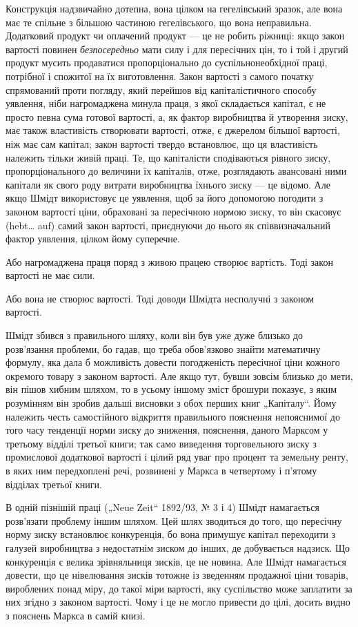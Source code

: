 Конструкція надзвичайно дотепна, вона цілком на гегелівський
зразок, але вона має те спільне з більшою частиною гегелівського,
що вона неправильна. Додатковий продукт чи оплачений
продукт — це не робить ріжниці: якщо закон вартості повинен
\emph{безпосередньо} мати силу і для пересічних цін, то і той і другий
продукт мусить продаватися пропорціонально до суспільнонеобхідної
праці, потрібної і спожитої на їх виготовлення. Закон
вартості з самого початку спрямований проти погляду, який перейшов
від капіталістичного способу уявлення, ніби нагромаджена
минула праця, з якої складається капітал, є не просто певна сума
готової вартості, а, як фактор виробництва й утворення зиску, має
також властивість створювати вартості, отже, є джерелом більшої
вартості, ніж має сам капітал; закон вартості твердо встановлює,
що ця властивість належить тільки живій праці. Те, що капіталісти
сподіваються рівного зиску, пропорціонального до величини
їх капіталів, отже, розглядають авансовані ними капітали як свого
роду витрати виробництва їхнього зиску — це відомо. Але якщо
Шмідт використовує це уявлення, щоб за його допомогою погодити
з законом вартості ціни, обраховані за пересічною нормою
зиску, то він скасовує (hebt\dots{} auf) самий закон вартості, приєднуючи
до нього як співвизначальний фактор уявлення, цілком
йому суперечне.

Або нагромаджена праця поряд з живою працею створює
вартість. Тоді закон вартості не має сили.

Або вона не створює вартості. Тоді доводи Шмідта несполучні
з законом вартості.

Шмідт збився з правильного шляху, коли він був уже дуже
близько до розв’язання проблеми, бо гадав, що треба обов’язково
знайти математичну формулу, яка дала б можливість довести
погодженість пересічної ціни кожного окремого товару з законом
вартості. Але якщо тут, бувши зовсім близько до мети, він
пішов хибним шляхом, то в усьому іншому зміст брошури показує,
з яким розумінням він зробив дальші висновки з обох перших
книг „Капіталу“. Йому належить честь самостійного відкриття
правильного пояснення непояснимої до того часу тенденції норми
зиску до зниження, пояснення, даного Марксом у третьому відділі
третьої книги; так само виведення торговельного зиску з
промислової додаткової вартості і цілий ряд уваг про процент
та земельну ренту, в яких ним передхоплені речі, розвинені у
Маркса в четвертому і п’ятому відділах третьої книги.

В одній пізнішій праці („Neue Zeit“ 1892/93, № 3 і 4)
Шмідт намагається розв’язати проблему іншим шляхом. Цей
шлях зводиться до того, що пересічну норму зиску встановлює
конкуренція, бо вона примушує капітал переходити з галузей
виробництва з недостатнім зиском до інших, де добувається
надзиск. Що конкуренція є велика зрівняльниця зисків, це не
новина. Але Шмідт намагається довести, що це нівелювання
зисків тотожне із зведенням продажної ціни товарів, вироблених
понад міру, до такої міри вартості, яку суспільство може
заплатити за них згідно з законом вартості. Чому і це не
могло привести до цілі, досить видно з пояснень Маркса в самій
книзі.


